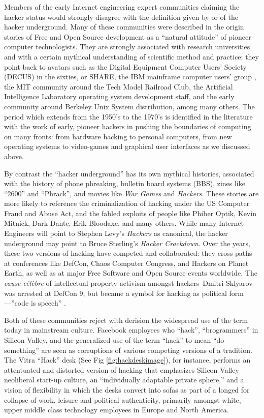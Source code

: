 \documentclass[10pt,letter,oneside]{scrartcl}
\begin{document}
Members of the early Internet engineering expert communities claiming the hacker
status would strongly disagree with the definition given by or of the hacker
underground. Many of these communities were described in the origin stories of
Free and Open Source development as a ``natural attitude'' of pioneer computer
technologists.  They are strongly associated with research universities and with
a certain mythical understanding of scientific method and practice; they point
back to avatars such as the Digital Equipment Computer Users' Society (DECUS) in
the sixties, or SHARE, the IBM mainframe computer users'
group \parencite{akera2001voluntarism}, the MIT community around the Tech Model
Railroad Club, the Artificial Intelligence Laboratory operating system
development staff, and the early community around Berkeley Unix System
distribution, among many others.  The period which extends from the 1950's to
the 1970's is identified in the literature with the work of early, pioneer
hackers in pushing the boundaries of computing on many fronts: from hardware
hacking to personal computers, from new operating systems to video-games and
graphical user interfaces as we discussed above.

By contrast the ``hacker underground'' has its own mythical histories,
associated with the history of phone phreaking, bulletin board systems (BBS),
zines like ``2600'' and ``Phrack'', and movies like \emph{War Games} and
\emph{Hackers}.  These stories are more likely to reference the criminalization
of hacking under the US Computer Fraud and Abuse Act, and the fabled exploits
of people like Phiber Optik, Kevin Mitnick, Dark Dante, Erik Bloodaxe, and many
others.  While many Internet Engineers will point to Stephen Levy's
\emph{Hackers} as canonical, the hacker underground may point to Bruce
Sterling's \emph{Hacker Crackdown}.  Over the years, these two versions of
hacking have competed and collaborated: they cross paths at conferences like
DefCon, Chaos Computer Congress, and Hackers on Planet Earth, as well as at
major Free Software and Open Source events worldwide.  The \emph{cause célèbre}
of intellectual property activism amongst hackers--Dmitri Sklyarov---was
arrested at DefCon 9, but became a symbol for hacking as political
form---''code is speech'' \parencite{coleman_code_2009}. 

Both of these communities reject with derision the widespread use of the term
today in mainstream culture.  Facebook employees who ``hack'', ``brogrammers''
in Silicon Valley, and the generalized use of the term ``hack'' to mean ``do
something'' are seen as corruptions of various competing versions of a
tradition.   The Vitra ``Hack'' desk (See Fig \ref{fig:hackdeskimage}), for instance, performs an
attentuated and distorted version of hacking that emphasizes Silicon Valley
neoliberal start-up culture, an ``individually adaptable private sphere,'' and
a vision of flexibility in which the desks convert into sofas as part of a
longed for collapse of work, leisure and political authenticity, primarily
amongst white, upper middle class technology employees in Europe and North
America. 
\end{document}
